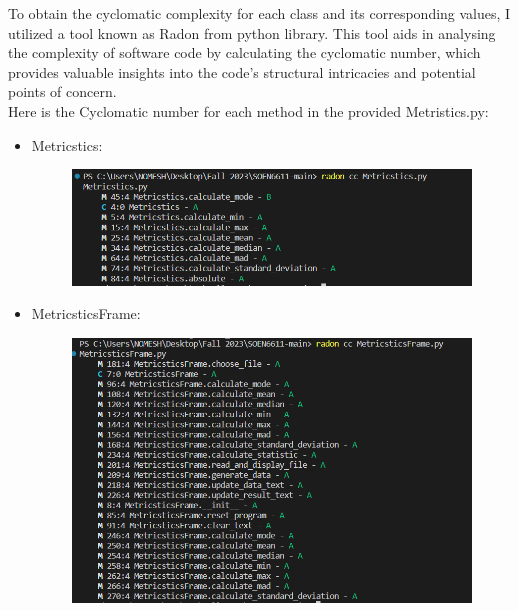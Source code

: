 {{{\normalsize{To obtain the cyclomatic complexity for each class and its corresponding values, I utilized a tool known as Radon from python library. This tool aids in analysing the complexity of software code by calculating the cyclomatic number, which provides valuable insights into the code’s structural intricacies and potential points of concern.\linebreak}\\

\normalsize{Here is the Cyclomatic number for each method in the provided Metristics.py:\linebreak}

\begin{itemize} 
    \item Metricstics:
   \begin{figure}[H]
    \centering
    \includegraphics[width=1 \linewidth]{Metric_cc.png} 
\end{figure}
    \item MetricsticsFrame:
         \begin{figure}[H]
        \centering
        \includegraphics[width=1 \linewidth]{Metricstics_cc.png} 

\end{figure}
\end{itemize}}}}
